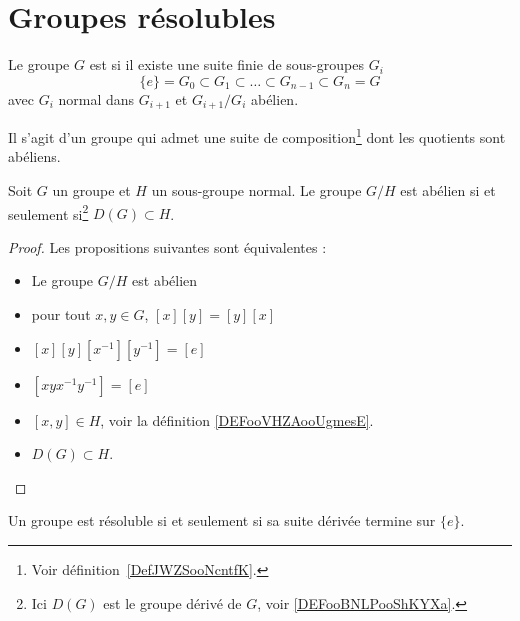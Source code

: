 \section{Groupes résolubles}

\begin{definition}  \label{DefOSYNooTROIKs}
	Le groupe \( G\) est  si il existe une suite finie de sous-groupes \( G_i\)
	\begin{equation}
		\{ e \}=G_0\subset G_1\subset\ldots\subset G_{n-1}\subset G_n=G
	\end{equation}
	avec \( G_{i}\) normal dans \( G_{i+1}\) et \( G_{i+1}/G_i\) abélien.
\end{definition}

Il s'agit d'un groupe qui admet une suite de composition\footnote{Voir définition~\ref{DefJWZSooNcntfK}.} dont les quotients sont abéliens.

\begin{lemma}   \label{LemOARMooYhYmbH}
	Soit \( G\) un groupe et \( H\) un sous-groupe normal. Le groupe \( G/H\) est abélien si et seulement si\footnote{Ici \( D(G)\) est le groupe dérivé de \( G\), voir \ref{DEFooBNLPooShKYXa}.} \( D(G)\subset H\).
\end{lemma}

\begin{proof}
	Les propositions suivantes sont équivalentes :
	\begin{itemize}
		\item Le groupe \( G/H\) est abélien
		\item pour tout \( x,y\in G\), \( [x][y]=[y][x]\)
		\item \( [x][y][x^{-1}][y^{-1}]=[e]\)
		\item \( [xyx^{-1}y^{-1}] =[e]\)
		\item \( [x,y]\in H\), voir la définition  \ref{DEFooVHZAooUgmesE}.
		\item \( D(G)\subset H\).
	\end{itemize}
\end{proof}

\begin{proposition} \label{PropRWYZooTarnmm}
	Un groupe est résoluble si et seulement si sa suite dérivée termine sur \( \{ e \}\).
\end{proposition}

